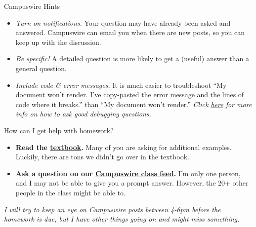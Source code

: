 \documentclass[
  ignorenonframetext,
]{beamer}
\begin{document}
\begin{frame}{Campuswire Hints}
\label{campuswire-hints}
\begin{itemize}
\item
  \emph{Turn on notifications.} Your question may have already been
  asked and answered. Campuswire can email you when there are new posts,
  so you can keep up with the discussion.
\item
  \emph{Be specific!} A detailed question is more likely to get a
  (useful) answer than a general question.
\item
  \emph{Include code \& error messages.} It is much easier to
  troubleshoot ``My document won't render. I've copy-pasted the error
  message and the lines of code where it breaks.'' than ``My document
  won't render.'' \emph{Click
  \href{https://stackoverflow.com/help/minimal-reproducible-example}{here}
  for more info on how to ask good debugging questions.}
\end{itemize}
\end{frame}

\begin{frame}{How can I get help with homework?}
\label{how-can-i-get-help-with-homework}
\begin{itemize}
\item
  \textbf{Read the
  \href{https://canvas.jcu.edu/files/3669904/download?download_frd=1}{textbook}.}
  Many of you are asking for additional examples. Luckily, there are
  tons we didn't go over in the textbook.
\item
  \textbf{Ask a question on our
  \href{https://campuswire.com/c/G6427C531/feed}{Campuswire class
  feed}.} I'm only one person, and I may not be able to give you a
  prompt answer. However, the 20+ other people in the class might be
  able to.
\end{itemize}

\emph{I will try to keep an eye on Campuswire posts between 4-6pm before
the homework is due, but I have other things going on and might miss
something.}
\end{frame}
\end{document}
